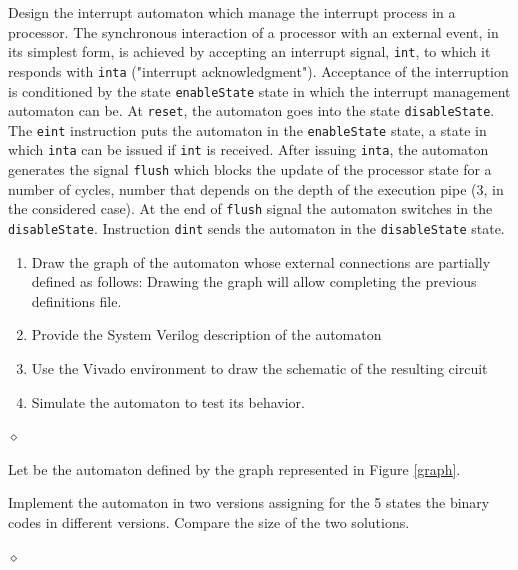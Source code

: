 \begin{problem}
Design the interrupt automaton which manage the interrupt process in a processor. The synchronous interaction of a processor with an external event, in its simplest form, is achieved by accepting an interrupt signal, {\tt int}, to which it responds with {\tt inta} ("interrupt acknowledgment"). Acceptance of the interruption is conditioned by the state {\tt enableState} state in which the interrupt management automaton can be. At {\tt reset}, the automaton goes into the state {\tt disableState}. The {\tt eint} instruction puts the automaton in the {\tt enableState} state, a state in which {\tt inta} can be issued if {\tt int} is received. After issuing {\tt inta}, the automaton generates the signal {\tt flush} which blocks the update of the processor state for a number of cycles, number that depends on the depth of the execution pipe (3, in the considered case). At the end of {\tt flush} signal the automaton switches in the  {\tt disableState}. Instruction {\tt dint} sends the automaton in the {\tt disableState} state.

{\em
{}
}     

\begin{enumerate}
    \item Draw the graph of the automaton whose external connections are partially defined as follows:
Drawing the graph will allow completing the previous definitions file.
    \item Provide the System Verilog description of the automaton
    \item Use the Vivado environment to draw the schematic of the resulting circuit
    \item Simulate the automaton to test its behavior.
\end{enumerate}

$\diamond$
\end{problem}

\begin{problem}
Let be the automaton defined by the graph represented in Figure \ref{graph}.


{\em
{}
}    
Implement the automaton in two versions assigning for the 5 states the binary codes in different versions. Compare the size of the two solutions.

$\diamond$
\end{problem}

